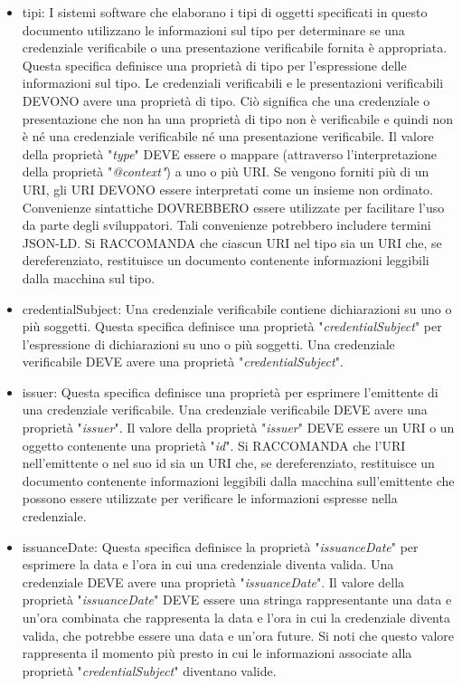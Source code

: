 \begin{itemize}
\item tipi: I sistemi software che elaborano i tipi di oggetti specificati in questo documento utilizzano le informazioni sul tipo per determinare se una credenziale verificabile o 
una presentazione verificabile fornita è appropriata. Questa specifica definisce una proprietà di tipo per l'espressione delle informazioni sul tipo.
Le credenziali verificabili e le presentazioni verificabili DEVONO avere una proprietà di tipo. Ciò significa che una credenziale o presentazione che non ha una proprietà di 
tipo non è verificabile e quindi non è né una credenziale verificabile né una presentazione verificabile.
Il valore della proprietà "\textit{type}" DEVE essere o mappare (attraverso l'interpretazione della proprietà "\textit{@context"}) a uno o più URI. Se vengono forniti più di un URI, gli URI DEVONO 
essere interpretati come un insieme non ordinato. Convenienze sintattiche DOVREBBERO essere utilizzate per facilitare l'uso da parte degli sviluppatori. Tali convenienze potrebbero 
includere termini JSON-LD. Si RACCOMANDA che ciascun URI nel tipo sia un URI che, se dereferenziato, restituisce un documento contenente informazioni leggibili dalla macchina sul tipo.

\item credentialSubject: Una credenziale verificabile contiene dichiarazioni su uno o più soggetti. Questa specifica definisce una proprietà "\textit{credentialSubject}" per 
l'espressione di dichiarazioni su uno o più soggetti.
Una credenziale verificabile DEVE avere una proprietà "\textit{credentialSubject}".

\item issuer: Questa specifica definisce una proprietà per esprimere l'emittente di una credenziale verificabile.
Una credenziale verificabile DEVE avere una proprietà "\textit{issuer}". Il valore della proprietà "\textit{issuer}" DEVE essere un URI o un oggetto contenente una proprietà "\textit{id}". Si RACCOMANDA 
che l'URI nell'emittente o nel suo id sia un URI che, se dereferenziato, restituisce un documento contenente informazioni leggibili dalla macchina sull'emittente che possono 
essere utilizzate per verificare le informazioni espresse nella credenziale.

\item issuanceDate: Questa specifica definisce la proprietà "\textit{issuanceDate}" per esprimere la data e l'ora in cui una credenziale diventa valida.
Una credenziale DEVE avere una proprietà "\textit{issuanceDate}". Il valore della proprietà "\textit{issuanceDate}" DEVE essere una stringa rappresentante una data e un'ora combinata che rappresenta la data e l'ora in cui la credenziale diventa valida, che potrebbe essere una data e un'ora future. Si noti che questo valore rappresenta il momento più presto 
in cui le informazioni associate alla proprietà "\textit{credentialSubject}" diventano valide.


\end{itemize}
